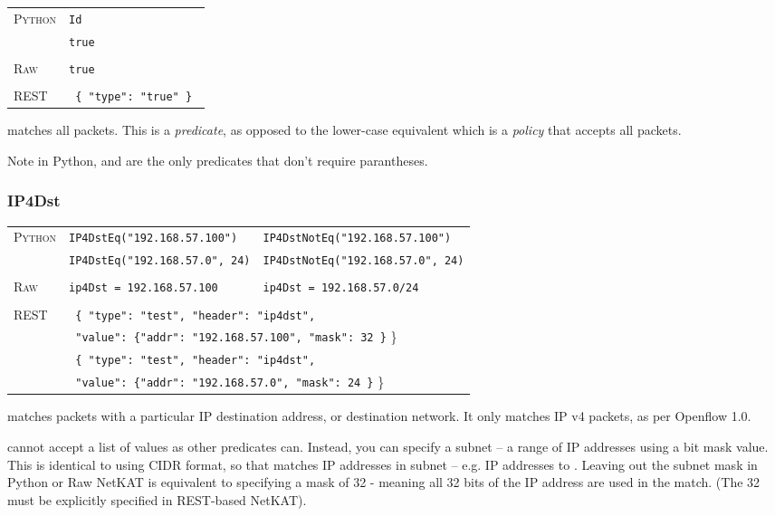 \bigskip
\begin{tabularx}{\linewidth}{lX}
\textsc{Python}   & \texttt{Id} \\
   & \texttt{true} \\ \\
\textsc{Raw}    & \texttt{true}  \\ \\
\textsc{REST} & \texttt{ \{ "type": "true" \} } 
\end{tabularx}

 matches all packets.  This is a \emph{predicate}, as opposed to the lower-case 
equivalent  
which is a \emph{policy} that accepts all packets. 

Note in Python,  and  are the only predicates that don't require parantheses.

\subsubsection{IP4Dst}

\bigskip
\begin{tabularx}{\linewidth}{lXX}
\textsc{Python}   & \texttt{IP4DstEq("192.168.57.100")}    & \texttt{IP4DstNotEq("192.168.57.100")} \\
    & \texttt{IP4DstEq("192.168.57.0", 24)}  & \texttt{IP4DstNotEq("192.168.57.0", 24)} \\ \\
\textsc{Raw}    & \texttt{ip4Dst = 192.168.57.100}     & \texttt{ip4Dst = 192.168.57.0/24} \\ \\
\textsc{REST} & \multicolumn{2}{l}{\texttt{ \{ "type": "test", "header": "ip4dst",}} \\
   & \multicolumn{2}{l}{\texttt{  "value": \{"addr": "192.168.57.100", "mask": 32 \}} \}} \\
   & \multicolumn{2}{l}{\texttt{ \{ "type": "test", "header": "ip4dst",}} \\
   & \multicolumn{2}{l}{\texttt{  "value": \{"addr": "192.168.57.0", "mask": 24 \}} \}} \\
\end{tabularx}

 matches packets with a particular IP destination address, or destination network.  It only matches
IP v4 packets, as per Openflow 1.0.  

 cannot accept a list of values as other predicates can.  
Instead, you can specify a subnet -- a range
of IP addresses using a bit mask value.  This is identical to using CIDR format, so that 
 matches IP addresses in subnet  -- e.g. 
IP addresses  to .  Leaving out the subnet mask in Python 
or Raw NetKAT is equivalent to specifying a mask of 32 - meaning all 32 bits of the IP address are used
in the match.  (The 32 must be explicitly specified in REST-based NetKAT).

